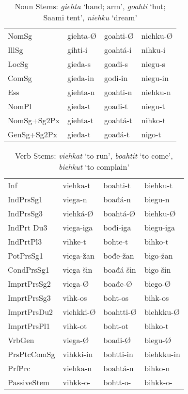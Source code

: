 \documentclass[a4paper,english]{article}
\begin{document}
\begin{table}[htdp]
\caption{Noun Stems: \emph{giehta} ‘hand; arm’, \emph{goahti} ‘hut; Saami tent’, \emph{niehku} ‘dream’}
\begin{center}
\begin{tabular}{llll}
NomSg & giehta-Ø & goahti-Ø & niehku-Ø \\ 
IllSg & gihti-i & goahtá-i & nihku-i \\ 
LocSg & gieđa-s & goađi-s & niegu-s \\ 
ComSg & gieđa-in & gođi-in & niegu-in \\ 
Ess & giehta-n & goahti-n & niehku-n \\ 
NomPl & gieđa-t & goađi-t & niegu-t \\ 
NomSg+Sg2Px & giehta-t & goahtá-t & nihko-t \\ 
GenSg+Sg2Px & gieđa-t & goađá-t & nigo-t
\end{tabular}
\end{center}
\label{nstems}
\end{table}%

\begin{table}[htdp]
\caption{Verb Stems: \emph{viehkat} ‘to run’, \emph{boahtit} ‘to come’, \emph{biehkut} ‘to complain’}
\begin{center}
\begin{tabular}{llll}
Inf & viehka-t & boahti-t & biehku-t \\ 
IndPrsSg1 & viega-n & boađá-n & biegu-n \\ 
IndPrsSg3 & viehká-Ø & boahtá-Ø & biehku-Ø \\ 
IndPrt Du3 & viega-iga & bođi-iga & biegu-iga \\ 
IndPrtPl3 & vihke-t & bohte-t & bihko-t \\ 
PotPrsSg1 & viega-žan & bođe-žan & bigo-žan \\ 
CondPrsSg1 & viega-šin & boađá-šin & bigo-šin \\ 
ImprtPrsSg2 & viega-Ø & boađe-Ø & biego-Ø \\ 
ImprtPrsSg3 & vihk-os & boht-os & bihk-os \\ 
ImprtPrsDu2 & viehkki-Ø & boahtti-Ø & biehkku-Ø \\ 
ImprtPrsPl1 & vihk-ot & boht-ot & bihko-t \\ 
VrbGen & viega-Ø & boađi-Ø & biegu-Ø \\ 
PrsPtcComSg & vihkki-in & bohtti-in & biehkku-in \\ 
PrfPrc & viehka-n & boahtá-n & bihko-n \\ 
PassiveStem & vihkk-o- & bohtt-o- & bihkk-o-
\end{tabular}
\end{center}
\label{vstems}
\end{table}%
\end{document}
